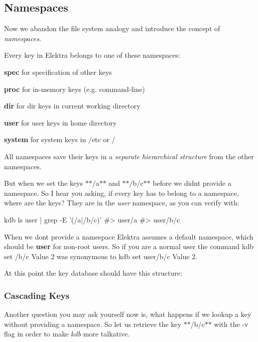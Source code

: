 \subsection*{Namespaces}

Now we abandon the file system analogy and introduce the concept of {\itshape namespaces}.

Every key in Elektra belongs to one of these namespaces\+:


\begin{DoxyItemize}
\item {\bfseries spec} for specification of other keys
\item {\bfseries proc} for in-\/memory keys (e.\+g. command-\/line)
\item {\bfseries dir} for dir keys in current working directory
\item {\bfseries user} for user keys in home directory
\item {\bfseries system} for system keys in {\ttfamily /etc} or {\ttfamily /}
\end{DoxyItemize}

All namespaces save their keys in a {\itshape separate hierarchical structure} from the other namespaces.

But when we set the keys $\ast$$\ast$/a$\ast$$\ast$ and $\ast$$\ast$/b/c$\ast$$\ast$ before we didn\textquotesingle{}t provide a namespace. So I hear you asking, if every key has to belong to a namespace, where are the keys? They are in the {\itshape user} namespace, as you can verify with\+:


\begin{DoxyCode}
kdb ls user | grep -E '(/a|/b/c)'
#> user/a
#> user/b/c
\end{DoxyCode}


When we don\textquotesingle{}t provide a namespace Elektra assumes a default namespace, which should be {\bfseries user} for non-\/root users. So if you are a normal user the command {\ttfamily kdb set /b/c \textquotesingle{}Value 2\textquotesingle{}} was synonymous to {\ttfamily kdb set user/b/c \textquotesingle{}Value 2\textquotesingle{}}.

At this point the key database should have this structure\+: 

\subsubsection*{Cascading Keys}

Another question you may ask yourself now is, what happens if we lookup a key without providing a namespace. So let us retrieve the key $\ast$$\ast$/b/c$\ast$$\ast$ with the -\/v flag in order to make {\itshape kdb} more talkative.


